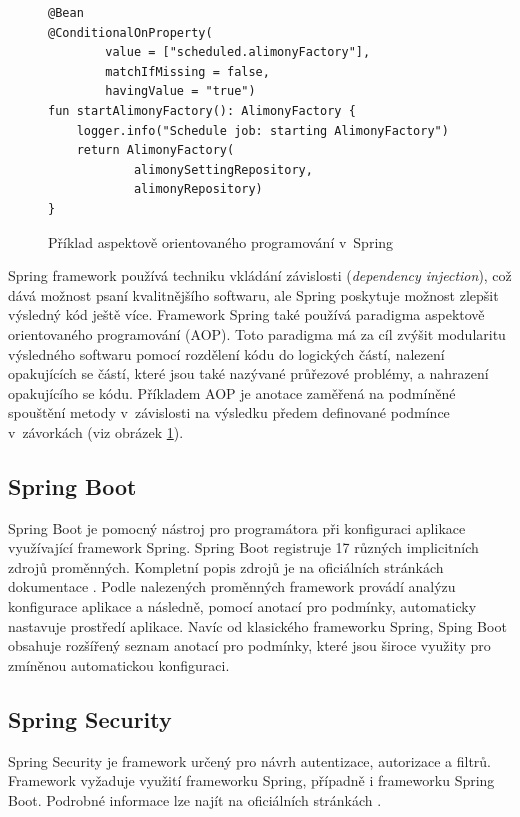         
        \begin{figure}
            \begin{verbatim}
@Bean
@ConditionalOnProperty(
        value = ["scheduled.alimonyFactory"],
        matchIfMissing = false,
        havingValue = "true")
fun startAlimonyFactory(): AlimonyFactory {
    logger.info("Schedule job: starting AlimonyFactory")
    return AlimonyFactory(
            alimonySettingRepository,
            alimonyRepository)
}
            \end{verbatim}
            \caption{Příklad aspektově orientovaného programování v~Spring} 
            \label{code:spring-conditional}
        \end{figure}
        Spring framework používá techniku vkládání závislosti (\textit{dependency injection}), což dává možnost psaní kvalitnějšího softwaru, ale Spring poskytuje možnost zlepšit výsledný kód ještě více. Framework Spring také používá paradigma aspektově orientovaného programování (AOP). Toto paradigma má za cíl zvýšit modularitu výsledného softwaru pomocí rozdělení kódu do logických částí, nalezení opakujících se částí, které jsou také nazývané průřezové problémy, a nahrazení opakujícího se kódu. Příkladem AOP je anotace zaměřená na podmíněné spouštění metody v~závislosti na výsledku předem definované podmínce v~závorkách (viz obrázek \ref{code:spring-conditional}).
    
    \subsection{Spring Boot}
        Spring Boot je pomocný nástroj pro programátora při konfiguraci aplikace využívající framework Spring. Spring Boot registruje 17 různých implicitních zdrojů proměnných. Kompletní popis zdrojů je na oficiálních stránkách dokumentace \cite{spring-property-sources}. Podle nalezených proměnných framework provádí analýzu konfigurace aplikace a následně, pomocí anotací pro podmínky, automaticky nastavuje prostředí aplikace. Navíc od klasického frameworku Spring, Sping Boot obsahuje rozšířený seznam anotací pro podmínky, které jsou široce využity pro zmíněnou automatickou konfiguraci.\cite{spring-boot}
    
    \subsection{Spring Security}
        Spring Security je framework určený pro návrh autentizace, autorizace a filtrů. Framework vyžaduje využití frameworku Spring, případně i frameworku Spring Boot. Podrobné informace lze najít na oficiálních stránkách \cite{spring-security}.
    
